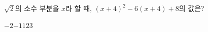 $\sqrt{2}$의 소수 부분을 $x$라 할 때, $(x+4)^2-6(x+4)+8$의 값은?
\begin{choices32}{$-2$}{$-1$}{$1$}{$2$}{$3$}\end{choices32}
